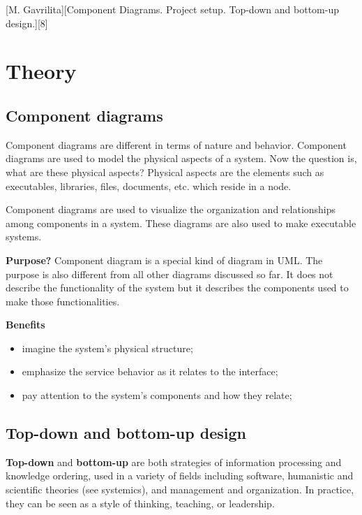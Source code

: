 \documentclass{article}
\begin{document}
	[M. Gavrilita][Component Diagrams. Project setup. Top-down and bottom-up design.][8]

	\section{Theory}
		\subsection{Component diagrams}
			Component diagrams are different in terms of nature and behavior. Component diagrams are used to model the physical aspects of a system. Now the question is, what are these physical aspects? Physical aspects are the elements such as executables, libraries, files, documents, etc. which reside in a node.

			Component diagrams are used to visualize the organization and relationships among components in a system. These diagrams are also used to make executable systems.

			\textbf{Purpose?} Component diagram is a special kind of diagram in UML. The purpose is also different from all other diagrams discussed so far. It does not describe the functionality of the system but it describes the components used to make those functionalities.

			\textbf{Benefits}
			\begin{itemize}
				\item imagine the system’s physical structure;
				
				\item emphasize the service behavior as it relates to the interface;
				
				\item pay attention to the system’s components and how they relate;
			\end{itemize}

		\subsection{Top-down and bottom-up design}
			\textbf{Top-down} and \textbf{bottom-up} are both strategies of information processing and knowledge ordering, used in a variety of fields including software, humanistic and scientific theories (see systemics), and management and organization. In practice, they can be seen as a style of thinking, teaching, or leadership.
\end{document}
